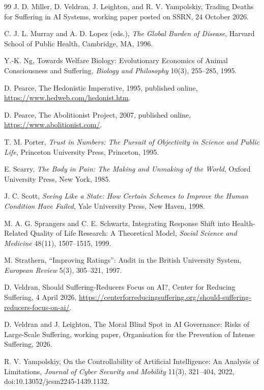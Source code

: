 \documentclass[11pt]{article}
\begin{document}
\begin{thebibliography}{99}
 J. D. Miller, D. Veldran, J. Leighton, and R. V. Yampolskiy, Trading Deaths for Suffering in AI Systems, working paper posted on SSRN, 24 October 2026.

 C. J. L. Murray and A. D. Lopez (eds.), \emph{The Global Burden of Disease}, Harvard School of Public Health, Cambridge, MA, 1996.

 Y.-K. Ng, Towards Welfare Biology: Evolutionary Economics of Animal Consciousness and Suffering, \emph{Biology and Philosophy} 10(3), 255--285, 1995.

 D. Pearce, The Hedonistic Imperative, 1995, published online, \url{https://www.hedweb.com/hedonist.htm}.

 D. Pearce, The Abolitionist Project, 2007, published online, \url{https://www.abolitionist.com/}.

 T. M. Porter, \emph{Trust in Numbers: The Pursuit of Objectivity in Science and Public Life}, Princeton University Press, Princeton, 1995.

 E. Scarry, \emph{The Body in Pain: The Making and Unmaking of the World}, Oxford University Press, New York, 1985.

 J. C. Scott, \emph{Seeing Like a State: How Certain Schemes to Improve the Human Condition Have Failed}, Yale University Press, New Haven, 1998.

 M. A. G. Sprangers and C. E. Schwartz, Integrating Response Shift into Health-Related Quality of Life Research: A Theoretical Model, \emph{Social Science and Medicine} 48(11), 1507--1515, 1999.

 M. Strathern, ``Improving Ratings'': Audit in the British University System, \emph{European Review} 5(3), 305--321, 1997.

 D. Veldran, Should Suffering-Reducers Focus on AI?, Center for Reducing Suffering, 4 April 2026, \url{https://centerforreducingsuffering.org/should-suffering-reducers-focus-on-ai/}.

 D. Veldran and J. Leighton, The Moral Blind Spot in AI Governance: Risks of Large-Scale Suffering, working paper, Organisation for the Prevention of Intense Suffering, 2026.

 R. V. Yampolskiy, On the Controllability of Artificial Intelligence: An Analysis of Limitations, \emph{Journal of Cyber Security and Mobility} 11(3), 321--404, 2022, doi:10.13052/jcsm2245-1439.1132.

\end{thebibliography}
\end{document}
